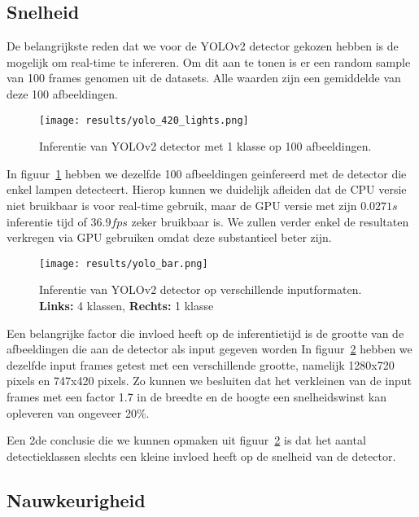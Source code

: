 \subsection{Snelheid}

De belangrijkste reden dat we voor de YOLOv2 detector gekozen hebben is de mogelijk om real-time te infereren.
Om dit aan te tonen is er een random sample van 100 frames genomen uit de datasets. Alle waarden zijn een gemiddelde van deze 100 afbeeldingen.

\begin{figure}
    \texttt{[image: results/yolo\_420\_lights.png]}
    \caption{Inferentie van YOLOv2 detector met 1 klasse op 100 afbeeldingen.}
    \label{fig:speed_lights}
\end{figure}

In figuur~\ref{fig:speed_lights} hebben we dezelfde 100 afbeeldingen geinfereerd met de detector die enkel lampen detecteert.
Hierop kunnen we duidelijk afleiden dat de \gls{CPU} versie niet bruikbaar is voor real-time gebruik, maar de \gls{GPU} versie
met zijn $0.0271 s$ inferentie tijd of $36.9 fps$ zeker bruikbaar is. We zullen verder enkel de resultaten verkregen via \gls{GPU}
gebruiken omdat deze substantieel beter zijn.

\begin{figure}[h]
    \texttt{[image: results/yolo\_bar.png]}
    \caption{Inferentie van YOLOv2 detector op verschillende inputformaten. \textbf{Links:} 4 klassen, \textbf{Rechts:} 1 klasse}
    \label{fig:speed_bar}
\end{figure}

Een belangrijke factor die invloed heeft op de inferentietijd is de grootte van de afbeeldingen die aan de detector als input gegeven worden
In figuur~\ref{fig:speed_bar} hebben we dezelfde input frames getest met een verschillende grootte, namelijk 1280x720 pixels en 747x420 pixels.
Zo kunnen we besluiten dat het verkleinen van de input frames met een factor 1.7 in de breedte en de hoogte een snelheidswinst kan opleveren van
ongeveer 20\%.

Een 2de conclusie die we kunnen opmaken uit figuur~\ref{fig:speed_bar} is dat het aantal detectieklassen slechts een kleine invloed heeft op de snelheid van de detector.


\subsection{Nauwkeurigheid}

